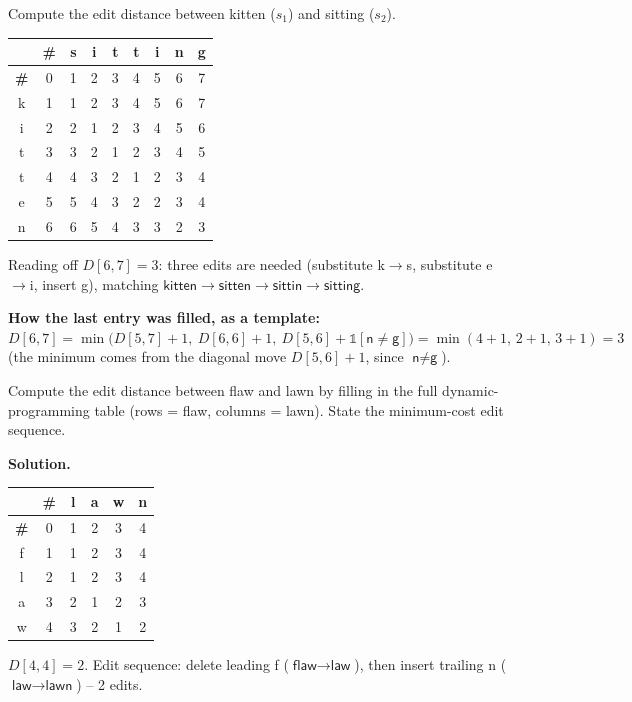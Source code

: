 \documentclass[11pt, a4paper]{article}
\newcommand{\Solution}{\medskip\noindent\textbf{\color{exgreen}Solution.}\ }
\begin{document}
\begin{examplebox}
Compute the edit distance between \textsf{kitten} ($s_1$) and \textsf{sitting} ($s_2$).

\begin{center}
\begin{tabular}{@{}c|cccccccc@{}}
 & \textbf{\#} & s & i & t & t & i & n & g \\
\midrule
\textbf{\#} & 0 & 1 & 2 & 3 & 4 & 5 & 6 & 7 \\
k & 1 & 1 & 2 & 3 & 4 & 5 & 6 & 7 \\
i & 2 & 2 & 1 & 2 & 3 & 4 & 5 & 6 \\
t & 3 & 3 & 2 & 1 & 2 & 3 & 4 & 5 \\
t & 4 & 4 & 3 & 2 & 1 & 2 & 3 & 4 \\
e & 5 & 5 & 4 & 3 & 2 & 2 & 3 & 4 \\
n & 6 & 6 & 5 & 4 & 3 & 3 & 2 & 3 \\
\end{tabular}
\end{center}

Reading off $D[6,7] = 3$: three edits are needed (substitute \textsf{k}$\to$\textsf{s}, substitute \textsf{e}$\to$\textsf{i}, insert \textsf{g}), matching $\textsf{kitten} \to \textsf{sitten} \to \textsf{sittin} \to \textsf{sitting}$.

\textbf{How the last entry was filled, as a template:} $D[6,7] = \min\big(D[5,7]+1,\ D[6,6]+1,\ D[5,6]+\mathbb{1}[\textsf{n}\ne\textsf{g}]\big) = \min(4+1,\,2+1,\,3+1) = 3$ (the minimum comes from the diagonal move $D[5,6]+1$, since $\textsf{n}\ne\textsf{g}$).
\end{examplebox}

\begin{exercisebox}
Compute the edit distance between \textsf{flaw} and \textsf{lawn} by filling in the full dynamic-programming table (rows = \textsf{flaw}, columns = \textsf{lawn}). State the minimum-cost edit sequence.
\end{exercisebox}

\Solution
\begin{center}
\begin{tabular}{@{}c|ccccc@{}}
 & \textbf{\#} & l & a & w & n \\
\midrule
\textbf{\#} & 0 & 1 & 2 & 3 & 4 \\
f & 1 & 1 & 2 & 3 & 4 \\
l & 2 & 1 & 2 & 3 & 4 \\
a & 3 & 2 & 1 & 2 & 3 \\
w & 4 & 3 & 2 & 1 & 2 \\
\end{tabular}
\end{center}
$D[4,4]=2$. Edit sequence: delete leading \textsf{f} ($\textsf{flaw}\to\textsf{law}$), then insert trailing \textsf{n} ($\textsf{law}\to\textsf{lawn}$) -- 2 edits.
\end{document}
